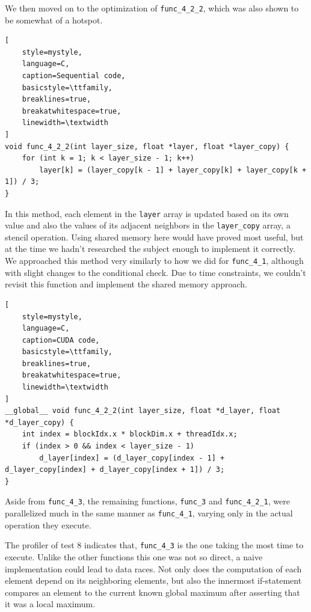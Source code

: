 \documentclass[10pt,journal,compsoc]{IEEEtran}
\begin{document}
We then moved on to the optimization of \texttt{func\-\_4\-\_2\-\_2}, which was also shown to be somewhat of a hotspot.

\begin{lstlisting}[
    style=mystyle,
    language=C,
    caption=Sequential code,
    basicstyle=\ttfamily,
    breaklines=true,
    breakatwhitespace=true,
    linewidth=\textwidth
]
void func_4_2_2(int layer_size, float *layer, float *layer_copy) {
    for (int k = 1; k < layer_size - 1; k++)
        layer[k] = (layer_copy[k - 1] + layer_copy[k] + layer_copy[k + 1]) / 3;
}

\end{lstlisting}


In this method, each element in the \texttt{layer} array is updated based on its own value and also the values of its adjacent
neighbors in the \texttt{layer\_copy} array, a stencil operation. Using shared memory here would have proved most useful, but at the time we hadn't researched the subject enough to implement it correctly. We approached this method very similarly to how we did for \texttt{func\_4\_1}, although with slight changes to the conditional check. Due to time constraints, we couldn't revisit this function and implement the shared memory approach.


\begin{lstlisting}[
    style=mystyle,
    language=C,
    caption=CUDA code,
    basicstyle=\ttfamily,
    breaklines=true,
    breakatwhitespace=true,
    linewidth=\textwidth
]
__global__ void func_4_2_2(int layer_size, float *d_layer, float *d_layer_copy) {
    int index = blockIdx.x * blockDim.x + threadIdx.x;
    if (index > 0 && index < layer_size - 1)
        d_layer[index] = (d_layer_copy[index - 1] + d_layer_copy[index] + d_layer_copy[index + 1]) / 3;
}
\end{lstlisting}

Aside from \texttt{func\-\_4\-\_3}, the remaining functions, \texttt{func\-\_3} and \texttt{func\-\_4\-\_2\-\_1}, were parallelized much in the same manner as \texttt{func\-\_4\-\_1}, varying only in the actual operation they execute.

The profiler of test 8 indicates that, \texttt{func\-\_4\-\_3} is the one taking the most time to execute.
Unlike the other functions this one was not so direct, a naive implementation could lead to data races. Not only does the computation of each element depend on its neighboring elements, but also the innermost if-statement compares an element to the current known global maximum after asserting that it was a local maximum. 
\end{document}
